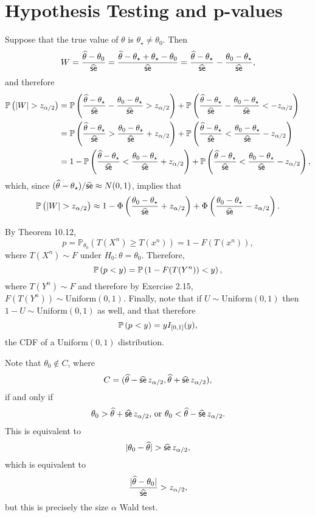 \chapter{Hypothesis Testing and p-values}

\begin{ex}
  Suppose that the true value of $\theta$ is $\theta_\star\neq \theta_0$. Then
  \begin{align*}
    W
    =\frac{\thetahat-\theta_0}{\sehat}
    =\frac{\thetahat-\theta_\star+\theta_\star-\theta_0}{\sehat}
    =\frac{\thetahat-\theta_\star}{\sehat}-\frac{\theta_0-\theta_\star}{\sehat},
  \end{align*}
  and therefore
  \begin{align*}
    \P{|W|>z_{\alpha/2}}
     & =\P{\frac{\thetahat-\theta_\star}{\sehat}-\frac{\theta_0-\theta_\star}{\sehat}>z_{\alpha/2}}
    +\P{\frac{\thetahat-\theta_\star}{\sehat}-\frac{\theta_0-\theta_\star}{\sehat}<-z_{\alpha/2}}       \\
     & =\P{\frac{\thetahat-\theta_\star}{\sehat}>\frac{\theta_0-\theta_\star}{\sehat} + z_{\alpha/2}}
    +\P{\frac{\thetahat-\theta_\star}{\sehat}<\frac{\theta_0-\theta_\star}{\sehat}-z_{\alpha/2}}        \\
     & =1-\P{\frac{\thetahat-\theta_\star}{\sehat}<\frac{\theta_0-\theta_\star}{\sehat} + z_{\alpha/2}}
    +\P{\frac{\thetahat-\theta_\star}{\sehat}<\frac{\theta_0-\theta_\star}{\sehat}-z_{\alpha/2}},
  \end{align*}
  which, since $(\thetahat-\theta_\star)/\sehat \approx N(0, 1)$, implies that
  \[
    \P{|W|>z_{\alpha/2}}\approx
    1-\Phi\left(\frac{\theta_0-\theta_\star}{\sehat} + z_{\alpha/2}\right)
    +\Phi\left(\frac{\theta_0-\theta_\star}{\sehat}-z_{\alpha/2}\right).
  \]
\end{ex}

\begin{ex}
  By Theorem 10.12,
  \[
    p=\mathbb{P}_{\theta_0}{(T(X^n)\geq T(x^n))}=1-F(T(x^n)),
  \]
  where $T(X^n)\sim F$ under $H_0:\theta=\theta_0$. Therefore,
  \[
    \P{p<y}
    =\P{1-F(T(Y^n))<y},
  \]
  where $T(Y^n)\sim F$ and therefore by Exercise 2.15,
  $F(T(Y^n))\sim\text{Uniform}(0, 1)$. Finally, note that if
  $U\sim\text{Uniform}(0,1)$ then $1-U\sim\text{Uniform}(0,1)$ as well, and that
  therefore
  \[
    \P{p<y}=yI_{[0,1]}(y),
  \]
  the CDF of a $\text{Uniform}(0,1)$ distribution.
\end{ex}

\begin{ex}
  Note that $\theta_0\not\in C$, where
  \[
    C=(\thetahat-\sehat \, z_{\alpha/2}, \thetahat+\sehat \, z_{\alpha/2}),
  \]
  if and only if
  \[
    \theta_0> \thetahat+\sehat\, z_{\alpha/2}\text{, or }
    \theta_0< \thetahat-\sehat\, z_{\alpha/2}.
  \]
  This is equivalent to
  \[
    |\theta_0-\thetahat|> \sehat\, z_{\alpha/2},
  \]
  which is equivalent to
  \[
    \frac{|\thetahat-\theta_0|}{\sehat} > z_{\alpha/2},
  \]
  but this is precisely the size $\alpha$ Wald test.
\end{ex}

